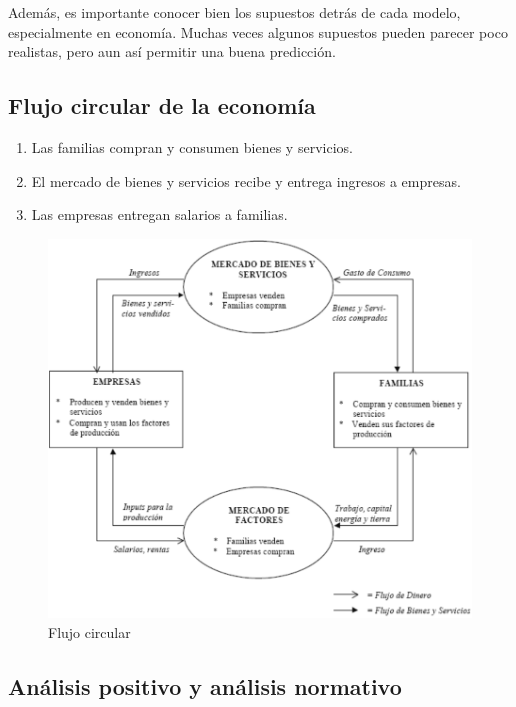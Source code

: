 \documentclass{report}
\begin{document}
Además, es importante conocer bien los supuestos detrás de cada modelo, especialmente en economía. Muchas veces algunos supuestos pueden parecer poco realistas, pero aun así permitir una buena predicción.

\subsection{Flujo circular de la economía}

\begin{enumerate}
\item Las familias compran y consumen bienes y servicios.
\item El mercado de bienes y servicios recibe y entrega ingresos a empresas.
\item Las empresas entregan salarios a familias.
\end{enumerate}

\begin{figure}[H]
\begin{center}
\includegraphics[width=12cm]{flujocircular.png}
\end{center}
\caption{Flujo circular}
\end{figure}

\subsection{Análisis positivo y análisis normativo}
\end{document}
